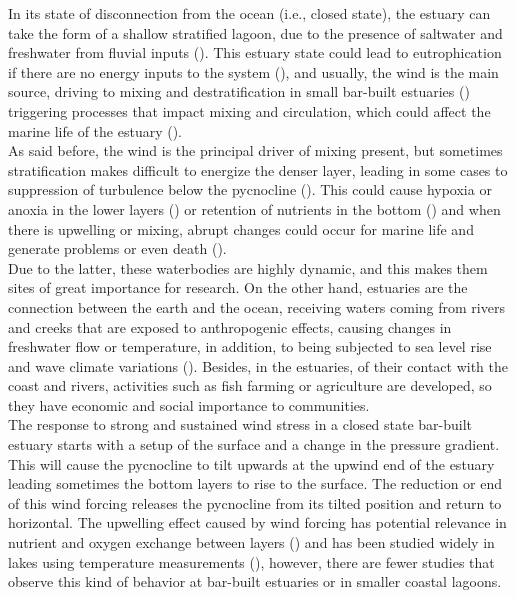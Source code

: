 \documentclass[11pt,letterpaper]{article}
\begin{document}
In its state of disconnection from the ocean (i.e., closed state), the estuary can take the form of a shallow stratified lagoon, due to the presence of saltwater and freshwater from fluvial inputs (\cite{Behrens2016}). This estuary state could lead to eutrophication if there are no energy inputs to the system (\cite{nunes2014responses}), and usually, the wind is the main source, driving to mixing and destratification in small bar-built estuaries (\cite{Gale2006}) triggering processes that impact mixing and circulation, which could affect the marine life of the estuary (\cite{marti2008relating}). \\

As said before, the wind is the principal driver of mixing present, but sometimes stratification makes difficult to energize the denser layer, leading in some cases to suppression of turbulence below the pycnocline (\cite{Cousins2010}). This could cause hypoxia or anoxia in the lower layers (\cite{Kelly2018}) or retention of nutrients in the bottom (\cite{Cousins2010}) and when there is upwelling or mixing, abrupt changes could occur for marine life and generate problems or even death (\cite{marti2008relating}).\\  

Due to the latter, these waterbodies are highly dynamic, and this makes them sites of great importance for research. On the other hand, estuaries are the connection between the earth and the ocean, receiving waters coming from rivers and creeks that are exposed to anthropogenic effects, causing changes in freshwater flow or temperature, in addition, to being subjected to sea level rise and wave climate variations (\cite{grez2020evidence, holt2010potential, thorne2021wetlands}). Besides, in the estuaries, of their contact with the coast and rivers, activities such as fish farming or agriculture are developed, so they have economic and social importance to communities. \\

The response to strong and sustained wind stress in a closed state bar-built estuary starts with a setup of the surface and a change in the pressure gradient. This will cause the pycnocline to tilt upwards at the upwind end of the estuary leading sometimes the bottom layers to rise to the surface. The reduction or end of this wind forcing releases the pycnocline from its tilted position and return to horizontal. The upwelling effect caused by wind forcing has potential relevance in nutrient and oxygen exchange between layers (\cite{Kelly2018}) and has been studied widely in lakes using temperature measurements (\cite{Coman2012, delafuente2010strong, roberts2021setup}), however, there are fewer studies that observe this kind of behavior at bar-built estuaries or in smaller coastal lagoons. \\
\end{document}
